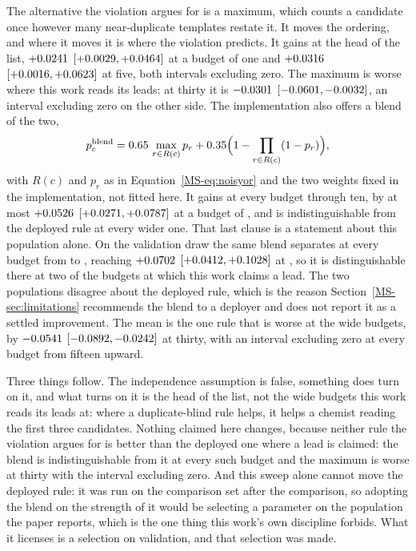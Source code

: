 \documentclass[journal=jcisd8,manuscript=suppinfo,layout=onecolumn]{achemso}
\begin{document}
The alternative the violation argues for is a maximum, which counts a candidate once however many
near-duplicate templates restate it. It moves the ordering, and where it moves it is where the
violation predicts. It gains at the head of the list, $+0.0241$
$[+0.0029, +0.0464]$ at a budget of one and
$+0.0316$ $[+0.0016, +0.0623]$ at five,
both intervals excluding zero. The maximum is worse where this work reads its leads: at thirty
it is $-0.0301$ $[-0.0601,
-0.0032]$, an interval excluding zero on the other side. The implementation
also offers a blend of the two,
\begin{equation}
  p_c^{\mathrm{blend}} = 0.65{}\,\max_{r \in R(c)} p_r
  + 0.35{}\Bigl(1 - \prod_{r \in R(c)}(1 - p_r)\Bigr),
  \label{eq:blend}
\end{equation}
with $R(c)$ and $p_r$ as in Equation~\ref{MS-eq:noisyor} and the two weights fixed in the
implementation, not fitted here. It gains at every budget through ten, by at most
$+0.0526$ $[+0.0271, +0.0787]$ at a budget of
\numAggCmpHybridMaxkWord{}, and is indistinguishable from the deployed rule at every wider one.
That last clause is a statement about this population alone. On the validation
draw the same blend separates at every budget from \numAggValHybridSepfromWord{} to
\numAggValHybridSepto{}, reaching $+0.0702$ $[+0.0412,
+0.1028]$ at \numAggValHybridMaxkWord{}, so it is distinguishable there at two of
the budgets at which this work claims a lead. The two populations disagree about the deployed rule,
which is the reason Section~\ref{MS-sec:limitations} recommends the blend to a deployer and does
not report it as a settled improvement. The mean is the one rule that is worse at the wide budgets,
by $-0.0541$ $[-0.0892,
-0.0242]$ at thirty, with an interval excluding zero at every budget from
fifteen upward.

Three things follow. The independence assumption is false, something does turn on it, and what
turns on it is the head of the list, not the wide budgets this work reads its leads at:
where a duplicate-blind rule helps, it helps a chemist reading the first three candidates.
Nothing claimed here changes, because neither rule the violation argues for is better than the
deployed one where a lead is claimed: the blend is indistinguishable from it at every such budget
and the maximum is worse at thirty with the interval excluding zero. And this sweep alone cannot
move the deployed rule: it was run on the comparison set after the
comparison, so adopting the blend on the strength of it would be selecting a parameter on the
population the paper reports, which is the one thing this work's own discipline forbids. What it
licenses is a selection on validation, and that selection was made.
\end{document}
